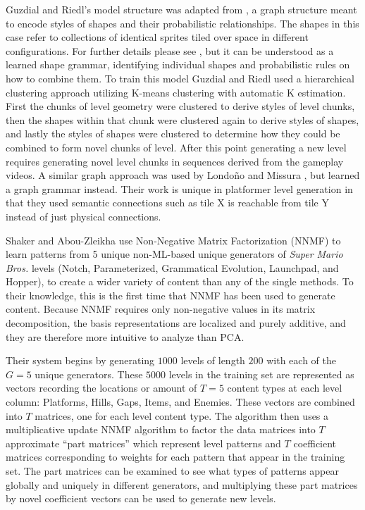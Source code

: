 \documentclass[12pt]{report}
\begin{document}
Guzdial and Riedl's model structure was adapted from \cite{kalogerakis:2012:SIG}, a graph structure meant to encode styles of shapes and their probabilistic relationships. The shapes in this case refer to collections of identical sprites tiled over space in different configurations. For further details please see \cite{guzdial2016game}, but it can be understood as a learned shape grammar, identifying individual shapes and probabilistic rules on how to combine them. To train this model Guzdial and Riedl used a hierarchical clustering approach utilizing K-means clustering with automatic K estimation. First the chunks of level geometry were clustered to derive styles of level chunks, then the shapes within that chunk were clustered again to derive styles of shapes, and lastly the styles of shapes were clustered to determine how they could be combined to form novel chunks of level. After this point generating a new level requires generating novel level chunks in sequences derived from the gameplay videos.   A similar graph approach was used by Londo\~{n}o and Missura \cite{MARIOGRAPHGRAMMAR}, but learned a graph grammar instead.  Their work is unique in platformer level generation in that they used semantic connections such as tile X is reachable from tile Y instead of just physical connections.

 Shaker and Abou-Zleikha \cite{shaker2014alone} use Non-Negative Matrix Factorization (NNMF) to learn patterns from 5 unique non-ML-based unique generators of \textit{Super Mario Bros.} levels (Notch, Parameterized, Grammatical Evolution, Launchpad, and Hopper), to create a wider variety of content than any of the single methods.  To their knowledge, this is the first time that NNMF has been used to generate content.  Because NNMF requires only non-negative values in its matrix decomposition, the basis representations are localized and purely additive, and they are therefore more intuitive to analyze than PCA.

Their system begins by generating $1000$ levels of length $200$ with each of the $G=5$ unique generators. These $5000$ levels in the training set are represented as vectors recording the locations or amount of $T=5$ content types at each level column: Platforms, Hills, Gaps, Items, and Enemies. These vectors are combined into $T$ matrices, one for each level content type.  The algorithm then uses a multiplicative update NNMF algorithm \cite{lee1999learning} to factor the data matrices into $T$ approximate ``part matrices'' which represent level patterns and $T$ coefficient matrices corresponding to weights for each pattern that appear in the training set.  The part matrices can be examined to see what types of patterns appear globally and uniquely in different generators, and multiplying these part matrices by novel coefficient vectors can be used to generate new levels. 
\end{document}
